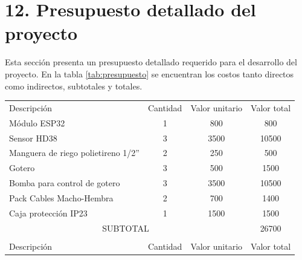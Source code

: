 \documentclass[
11pt, %
]{charter}
\begin{document}
\section{12. Presupuesto detallado del proyecto}
\label{sec:presupuesto}

Esta sección presenta un presupuesto detallado requerido para el desarrollo del proyecto. En la tabla \ref{tab:presupuesto} se encuentran los costos tanto directos como indirectos, subtotales y totales.

\begin{table}[htpb]
\centering
\begin{tabularx}{\linewidth}{@{}|X|c|r|r|@{}}
\hline
\rowcolor[HTML]{C0C0C0} 
\multicolumn{4}{|c|}{\cellcolor[HTML]{C0C0C0}COSTOS DIRECTOS} \\ \hline
\rowcolor[HTML]{C0C0C0} 
Descripción &
  \multicolumn{1}{c|}{\cellcolor[HTML]{C0C0C0}Cantidad} &
  \multicolumn{1}{c|}{\cellcolor[HTML]{C0C0C0}Valor unitario} &
  \multicolumn{1}{c|}{\cellcolor[HTML]{C0C0C0}Valor total} \\ \hline
 Módulo ESP32&
  \multicolumn{1}{c|}{1} &
  \multicolumn{1}{c|}{800} &
  \multicolumn{1}{c|}{800} \\ \hline
 Sensor HD38&
  \multicolumn{1}{c|}{3} &
  \multicolumn{1}{c|}{3500} &
  \multicolumn{1}{c|}{10500} \\ \hline
 Manguera de riego polietireno 1/2''&
  \multicolumn{1}{c|}{2} &
  \multicolumn{1}{c|}{250} &
  \multicolumn{1}{c|}{500} \\ \hline
 Gotero&
  \multicolumn{1}{c|}{3} &
  \multicolumn{1}{c|}{500} &
  \multicolumn{1}{c|}{1500} \\ \hline
 Bomba para control de gotero&
  \multicolumn{1}{c|}{3} &
  \multicolumn{1}{c|}{3500} &
  \multicolumn{1}{c|}{10500} \\ \hline
 Pack Cables Macho-Hembra&
  \multicolumn{1}{c|}{2} &
  \multicolumn{1}{c|}{700} &
  \multicolumn{1}{c|}{1400} \\ \hline
 Caja protección IP23&
  \multicolumn{1}{c|}{1} &
  \multicolumn{1}{c|}{1500} &
  \multicolumn{1}{c|}{1500} \\ \hline
\multicolumn{3}{|c|}{SUBTOTAL} &
  \multicolumn{1}{c|}{26700} \\ \hline
\rowcolor[HTML]{C0C0C0} 
\multicolumn{4}{|c|}{\cellcolor[HTML]{C0C0C0}COSTOS INDIRECTOS} \\ \hline
\rowcolor[HTML]{C0C0C0} 
Descripción &
  \multicolumn{1}{c|}{\cellcolor[HTML]{C0C0C0}Cantidad} &
  \multicolumn{1}{c|}{\cellcolor[HTML]{C0C0C0}Valor unitario} &
  \multicolumn{1}{c|}{\cellcolor[HTML]{C0C0C0}Valor total} \\ \hline

\end{tabularx}
\end{table}
\end{document}
